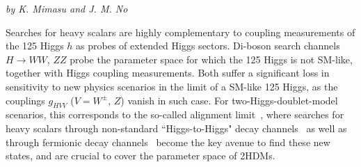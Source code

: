 
\begin{center}
 {\it{by K. Mimasu and J. M. No 
}}
\end{center}








Searches for heavy scalars are highly complementary to coupling measurements of the 125 \UGeV Higgs $h$ as probes of extended Higgs sectors. Di-boson search channels $H \to WW$, $ZZ$ probe the parameter space for which the 125 \UGeV Higgs is not SM-like, together with Higgs coupling measurements. Both suffer a significant loss in sensitivity to new physics scenarios in the limit of a SM-like 125 \UGeV Higgs, as the couplings $g_{HVV}$ ($V = W^{\pm},\,Z$) vanish in such case. For two-Higgs-doublet-model scenarios, this corresponds to the so-called alignment limit~\cite{Gunion:2002zf},
where searches for heavy scalars through non-standard ``Higgs-to-Higgs"
decay channels~\cite{Coleppa:2014hxa,Dorsch:2014qja,Li:2015lra,Kling:2016opi,Dorsch:2016tab} 
as well as through fermionic decay channels~\cite{Craig:2015jba,Gori:2016zto} become the key avenue to find these new states, and are crucial to cover the parameter space of 2HDMs.

